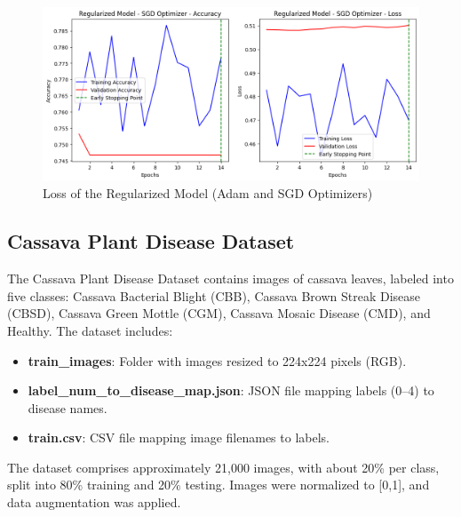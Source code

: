 \documentclass[a4paper,12pt]{article}
\begin{document}
\begin{figure}[H]
    \centering
    \includegraphics[width=1.0\textwidth]{assets/diabetes/sgd_diabetes_loss.png}
    \caption{Loss of the Regularized Model (Adam and SGD Optimizers)}
\end{figure}

\clearpage

\subsection*{Cassava Plant Disease Dataset}
The Cassava Plant Disease Dataset contains images of cassava leaves, labeled into five classes: Cassava Bacterial Blight (CBB), Cassava Brown Streak Disease (CBSD), Cassava Green Mottle (CGM), Cassava Mosaic Disease (CMD), and Healthy. The dataset includes:
\begin{itemize}
    \item \textbf{train\_images}: Folder with images resized to 224x224 pixels (RGB).
    \item \textbf{label\_num\_to\_disease\_map.json}: JSON file mapping labels (0–4) to disease names.
    \item \textbf{train.csv}: CSV file mapping image filenames to labels.
\end{itemize}
The dataset comprises approximately 21,000 images, with about 20\% per class, split into 80\% training and 20\% testing. Images were normalized to [0,1], and data augmentation was applied.
\end{document}

